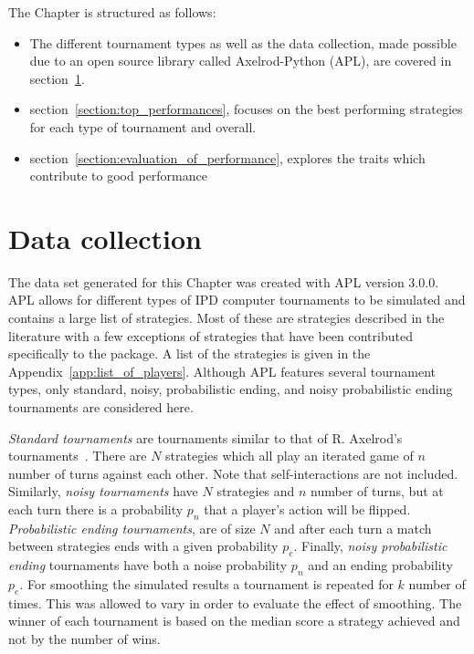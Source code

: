 The Chapter is structured as follows:

\begin{itemize}
    \item The different tournament types as well as the data collection, made
    possible due to an open source library called Axelrod-Python (APL),
    are covered in section~\ref{section:data_collection}.
    \item section~\ref{section:top_performances}, focuses on the best performing
    strategies for each type of tournament and overall.
    \item section~\ref{section:evaluation_of_performance}, explores the traits which
    contribute to good performance
\end{itemize}

\section{Data collection}\label{section:data_collection}

The data set generated for this Chapter was created with APL version 3.0.0.
APL allows for different types of IPD computer
tournaments to be simulated and contains a large list of strategies.
Most of these are strategies described in the literature with a few exceptions
of strategies that have been contributed specifically to the package. A
list of the strategies is given in the Appendix~\ref{app:list_of_players}.
Although APL features several tournament types, only
standard, noisy, probabilistic ending, and noisy probabilistic ending
tournaments are considered here.

\textit{Standard tournaments} are tournaments similar to that of R. Axelrod's
tournaments~\cite{Axelrod1980a}. There are \(N\) strategies which all play an iterated
game of \(n\) number of turns against each other. Note that self-interactions
are not included. Similarly, \textit{noisy
tournaments} have \(N\) strategies and \(n\) number of turns, but at each turn
there is a probability \(p_n\) that a player's action will be flipped.
\textit{Probabilistic ending tournaments}, are of size \(N\) and after each turn
a match between strategies ends with a given probability \(p_e\). Finally,
\textit{noisy probabilistic ending} tournaments have both a noise probability
\(p_n\) and an ending probability \(p_e\). For smoothing the simulated results a
tournament is repeated for \(k\) number of times. This was allowed to vary
in order to evaluate the effect of smoothing. The winner of each tournament
is based on the median score a strategy achieved and not by the number of wins.

